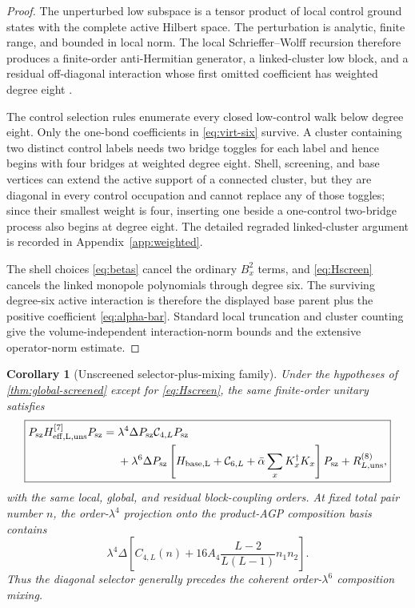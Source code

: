 \documentclass[11pt]{article}
\newtheorem{corollary}[theorem]{Corollary}
\theoremstyle{definition}
\theoremstyle{remark}
\newcommand{\cC}{\mathcal C}
\begin{document}
\begin{proof}
The unperturbed low subspace is a tensor product of local control ground states with the complete active Hilbert space.  The perturbation is analytic, finite range, and bounded in local norm.  The local Schrieffer--Wolff recursion therefore produces a finite-order anti-Hermitian generator, a linked-cluster low block, and a residual off-diagonal interaction whose first omitted coefficient has weighted degree eight \cite{Bravyi2011}.

The control selection rules enumerate every closed low-control walk below degree eight.  Only the one-bond coefficients in \eqref{eq:virt-six} survive.  A cluster containing two distinct control labels needs two bridge toggles for each label and hence begins with four bridges at weighted degree eight.  Shell, screening, and base vertices can extend the active support of a connected cluster, but they are diagonal in every control occupation and cannot replace any of those toggles; since their smallest weight is four, inserting one beside a one-control two-bridge process also begins at degree eight.  The detailed regraded linked-cluster argument is recorded in Appendix~\ref{app:weighted}.

The shell choices \eqref{eq:betas} cancel the ordinary $B_x^2$ terms, and \eqref{eq:Hscreen} cancels the linked monopole polynomials through degree six.  The surviving degree-six active interaction is therefore the displayed base parent plus the positive coefficient \eqref{eq:alpha-bar}.  Standard local truncation and cluster counting give the volume-independent interaction-norm bounds and the extensive operator-norm estimate.
\end{proof}

\begin{corollary}[Unscreened selector-plus-mixing family]
\label{cor:global-unscreened}
Under the hypotheses of \cref{thm:global-screened} except for \eqref{eq:Hscreen}, the same finite-order unitary satisfies
\begin{equation}
\boxed{
\begin{aligned}
P_{\rm sz}H_{\rm eff,L,{\rm uns}}^{[7]}P_{\rm sz}
={}&\lambda^4\Delta P_{\rm sz}\cC_{4,L}P_{\rm sz}\\
&+\lambda^6\Delta P_{\rm sz}\left[H_{\rm base,L}+\cC_{6,L}+\bar\alpha\sum_xK_x^\dagger K_x\right]P_{\rm sz}
+R_{L,{\rm uns}}^{(8)},
\end{aligned}}
\label{eq:global-unscreened-theorem}
\end{equation}
with the same local, global, and residual block-coupling orders.  At fixed total pair number $n$, the order-$\lambda^4$ projection onto the product-AGP composition basis contains
\begin{equation}
 \lambda^4\Delta\left[C_{4,L}(n)+16A_4\frac{L-2}{L(L-1)}n_1n_2\right].
 \label{eq:unscreened-selector}
\end{equation}
Thus the diagonal selector generally precedes the coherent order-$\lambda^6$ composition mixing.
\end{corollary}
\end{document}
